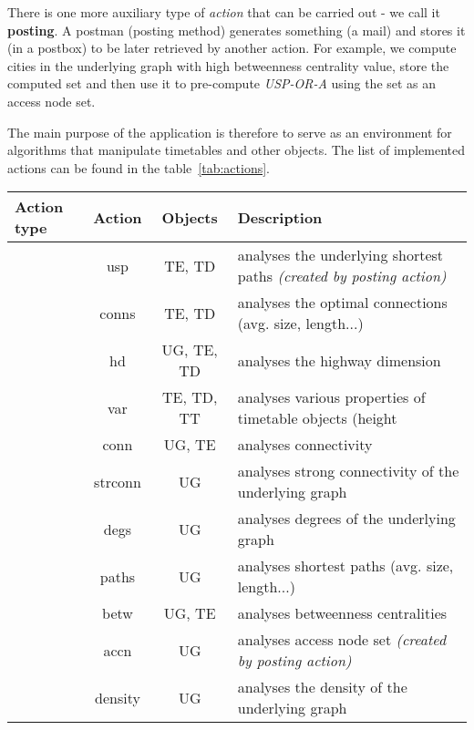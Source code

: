 \noindent There is one more auxiliary type of \textit{action} that can be carried out - we call it \textbf{posting}. A postman (posting method) generates something (a mail) and stores it (in a postbox) to be later retrieved by another action. For example, we compute cities in the underlying graph with high betweenness centrality value, store the computed set and then use it to pre-compute \textit{USP-OR-A} using the set as an access node set.

The main purpose of the application is therefore to serve as an environment for algorithms that manipulate timetables and other objects. The list of implemented actions can be found in the table~\ref{tab:actions}.

\begin{table}[h]
	\footnotesize
	\centering
    \begin{tabular}{l|c|c|l}
            \rowcolor{tablehead}
            \textbf{Action type} & \textbf{Action} & \textbf{Objects} & \textbf{Description} \\
		\hline
			\cellcolor{tablehead} & usp & TE, TD & \parbox{8cm}{analyses the underlying shortest paths \textit{(created by posting action)}} \\ 
			 & conns & TE, TD & analyses the optimal connections (avg. size, length...) \\ 
			 & hd & UG, TE, TD & analyses the highway dimension \\ 
			 & var & TE, TD, TT & analyses various properties of timetable objects (height \\ 
			 & conn & UG, TE & analyses connectivity \\ 
			 & strconn & UG & analyses strong connectivity of the underlying graph \\ 
			 & degs & UG & analyses degrees of the underlying graph \\ 
			 & paths & UG & analyses shortest paths (avg. size, length...) \\ 
			 & betw & UG, TE & analyses betweenness centralities \\ 
			 & accn & UG & analyses access node set \textit{(created by posting action)} \\ 
			 & density & UG & analyses the density of the underlying graph \\ 

\end{tabular}
\end{table}
